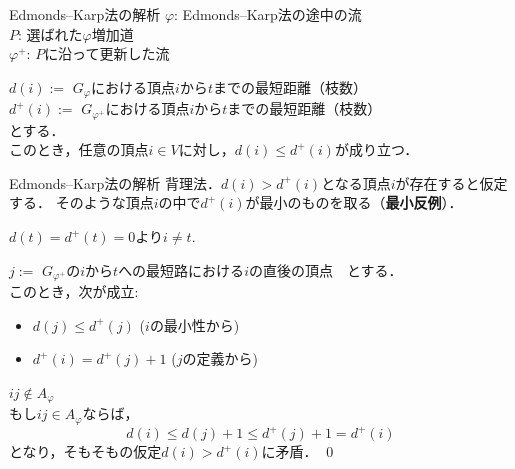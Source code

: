 \documentclass[14pt,aspectratio=169,xcolor=dvipsnames,table,onlytextwidth,dvipdfmx]{beamer}
\begin{document}
\begin{frame}{Edmonds--Karp法の解析}
    $\varphi$: Edmonds--Karp法の途中の流 \\
    $P$: 選ばれた$\varphi$増加道 \\
    $\varphi^+$: $P$に沿って更新した流

    \vfill
    \begin{lemma}[距離ラベルの単調性]
        $d(i) :=$ $G_\varphi$における頂点$i$から$t$までの最短距離（枝数） \\
        $d^+(i) :=$ $G_{\varphi^+}$における頂点$i$から$t$までの最短距離（枝数） \\
        とする．\\ 
        このとき，任意の頂点$i \in V$に対し，$d(i) \leq d^+(i)$が成り立つ．
    \end{lemma}
\end{frame}

\begin{frame}{Edmonds--Karp法の解析}
    背理法．$d(i) > d^+(i)$となる頂点$i$が存在すると仮定する．
    そのような頂点$i$の中で$d^+(i)$が最小のものを取る（\textbf{最小反例}）．
    
    \smallskip
    $d(t) = d^+(t) = 0$より$i \neq t$.
    
    \pause
    \bigskip
    $j :=$ $G_{\varphi^+}$の$i$から$t$への最短路における$i$の直後の頂点　とする． \\

    このとき，次が成立:
    \begin{itemize}
        \item $d(j) \leq d^+(j)$ \hfill ($i$の最小性から)
        \item $d^+(i) = d^+(j) + 1$ \hfill ($j$の定義から)
    \end{itemize}

    \pause
    \bigskip
     $ij \notin A_{\varphi}$ \\
    {\small {} もし$ij \in A_{\varphi}$ならば，
    \[
        d(i) \leq d(j) + 1 \leq d^+(j) + 1 = d^+(i) 
    \]
    となり，そもそもの仮定$d(i) > d^+(i)$に矛盾． 
    \qed
    }
\end{frame}
\end{document}
